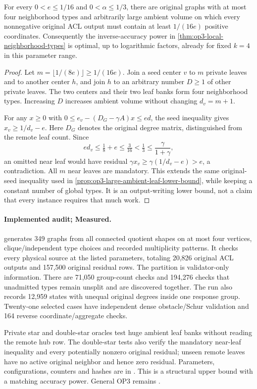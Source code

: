 \begin{proposition}
\label{prop:op3-four-type-output-lower-bound}
For every $0<e\leq1/16$ and $0<\alpha\leq1/3$, there are original
graphs with at most four neighborhood types and arbitrarily large ambient
volume on which every nonnegative original ACL output must contain at least
$1/(16e)$ positive coordinates. Consequently the inverse-accuracy power in
\cref{thm:op3-local-neighborhood-types} is optimal, up to logarithmic
factors, already for fixed $k=4$ in this parameter range.
\end{proposition}
\begin{proof}
Let $m=\lfloor1/(8e)\rfloor\geq1/(16e)$. Join a seed center $v$ to
$m$ private leaves and to another center $h$, and join $h$ to an arbitrary
number $D\geq1$ of other private leaves. The two centers and their two
leaf banks form four neighborhood types. Increasing $D$ increases ambient
volume without changing $d_v=m+1$.

For any $x\geq0$ with $0\leq e_v-(D_G-\gamma A)x\leq e d$, the seed
inequality gives $x_v\geq1/d_v-e$. Here $D_G$ denotes the original degree
matrix, distinguished from the remote leaf count. Since
\[
 e d_v\leq\tfrac18+e\leq\tfrac3{16}
 <\tfrac13\leq\frac\gamma{1+\gamma},
\]
an omitted near leaf would have residual
$\gamma x_v\geq\gamma(1/d_v-e)>e$, a contradiction. All $m$ near
leaves are mandatory. This extends the same original-seed inequality used
in \cref{prop:op3-large-ambient-leaf-lower-bound}, while keeping a constant
number of global types. It is an output-writing lower bound, not a claim
that every instance requires that much work.
\end{proof}

\paragraph{Implemented audit; Measured.}
 generates 349 graphs from all
connected quotient shapes on at most four vertices, clique/independent
type choices and recorded multiplicity patterns. It checks every physical
source at the listed parameters, totaling 20,826 original ACL outputs and
157,500 original residual rows. The partition is validator-only information.
There are 71,050 group-count checks and 194,276 checks that unadmitted types
remain unsplit and are discovered together. The run also records 12,959
states with unequal original degrees inside one response group. Twenty-one
selected cases have independent dense obstacle/Schur validation and 164
reverse coordinate/aggregate checks.

Private star and double-star oracles test huge ambient leaf banks without
reading the remote hub row. The double-star tests also verify the mandatory
near-leaf inequality and every potentially nonzero original residual;
unseen remote leaves have no active original neighbor and hence zero
residual. Parameters, configurations, counters and hashes are in
. This is a structural upper
bound with a matching accuracy power. General OP3 remains \statusopen.
